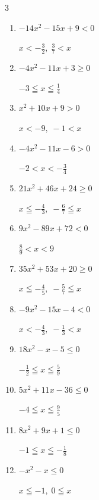 \begin{multicols}{3}
\begin{enumerate}
        $\displaystyle -\frac{5}{8} \leqq x \leqq \frac{8}{5}$

  \item $-14x^{2}-15x+9<0$

        $\displaystyle x < -\frac{3}{2} , \; \frac{3}{7} < x$

  \item $-4x^{2}-11x+3\geq 0$

        $\displaystyle -3 \leqq x \leqq \frac{1}{4}$

  \item $x^{2}+10x+9>0$

        $\displaystyle x < -9 , \; -1 < x$

  \item $-4x^{2}-11x-6>0$

        $\displaystyle -2 < x < -\frac{3}{4}$

  \item $21x^{2}+46x+24\geq 0$

        $\displaystyle x \leqq -\frac{4}{3} , \; -\frac{6}{7} \leqq x$

\columnbreak %

  \item $9x^{2}-89x+72<0$

        $\displaystyle \frac{8}{9} < x < 9$

  \item $35x^{2}+53x+20\geq 0$

        $\displaystyle x \leqq -\frac{4}{5} , \; -\frac{5}{7} \leqq x$

  \item $-9x^{2}-15x-4<0$

        $\displaystyle x < -\frac{4}{3} , \; -\frac{1}{3} < x$

  \item $18x^{2}-x-5\leq 0$

        $\displaystyle -\frac{1}{2} \leqq x \leqq \frac{5}{9}$

  \item $5x^{2}+11x-36\leq 0$

        $\displaystyle -4 \leqq x \leqq \frac{9}{5}$

  \item $8x^{2}+9x+1\leq 0$

        $\displaystyle -1 \leqq x \leqq -\frac{1}{8}$

  \item $-x^{2}-x\leq 0$

        $\displaystyle x \leqq -1 , \; 0 \leqq x$


\end{enumerate}
\end{multicols}
